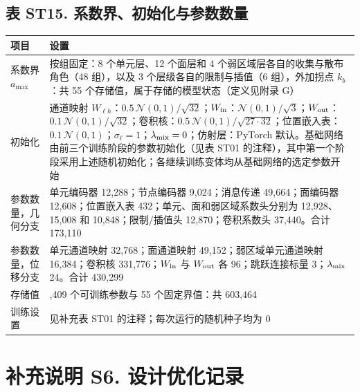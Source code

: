 \documentclass[preprint,12pt,authoryear]{elsarticle}
\begin{document}
\subsection{表 ST15. 系数界、初始化与参数数量}

{\small
\begin{longtable}[]{@{}
  >{\raggedright\arraybackslash}p{}
  >{\raggedright\arraybackslash}p{}@{}}
\toprule\noalign{}
\begin{minipage}[b]{\linewidth}\raggedright
项目
\end{minipage} & \begin{minipage}[b]{\linewidth}\raggedright
设置
\end{minipage} \\
\midrule\noalign{}
\endhead
\bottomrule\noalign{}
\endlastfoot
系数界 \(a_{\max}\) & 按组固定：8 个单元层、12 个面层和 4 个弱区域层各自的收集与散布角色（48 组），以及 3 个层级各自的限制与插值（6 组），外加拐点 \(k_b\)：共 55 个存储值，属于存储的模型状态（定义见附录 G） \\
初始化 & 通道映射 \(W_{\ell h}\)：\(0.5\,\mathcal N(0,1)/\sqrt{32}\)；\(W_{\rm in}\)：\(\mathcal N(0,1)/\sqrt3\)；\(W_{\rm out}\)：\(0.1\,\mathcal N(0,1)/\sqrt{32}\)；卷积核：\(0.5\,\mathcal N(0,1)/\sqrt{27\cdot32}\)；位置嵌入表：\(0.1\,\mathcal N(0,1)\)；\(\sigma_\ell=1\)；\(\lambda_{\rm mix}=0\)；仿射层：PyTorch 默认。基础网络由前三个训练阶段的参数初始化（见表 ST01 的注释），其中第一个阶段采用上述随机初始化；各继续训练变体均从基础网络的选定参数开始 \\
参数数量，几何分支 & 单元编码器 12,288；节点编码器 9,024；消息传递 49,664；面编码器 12,608；位置嵌入表 432；单元、面和弱区域系数头分别为 12,928、15,008 和 10,848；限制/插值头 12,870；卷积系数头 37,440。合计 173,110 \\
参数数量，位移分支 & 单元通道映射 32,768；面通道映射 49,152；弱区域单元通道映射 16,384；卷积核 331,776；\(W_{\rm in}\) 与 \(W_{\rm out}\) 各 96；跳跃连接标量 3；\(\lambda_{\rm mix}\) 24。合计 430,299 \\
存储值 & 603,409 个可训练参数与 55 个固定界值：共 603,464 \\
训练设置 & 见补充表 ST01 的注释；每次运行的随机种子均为 0 \\
\end{longtable}}

\section{补充说明 S6. 设计优化记录}
\end{document}
